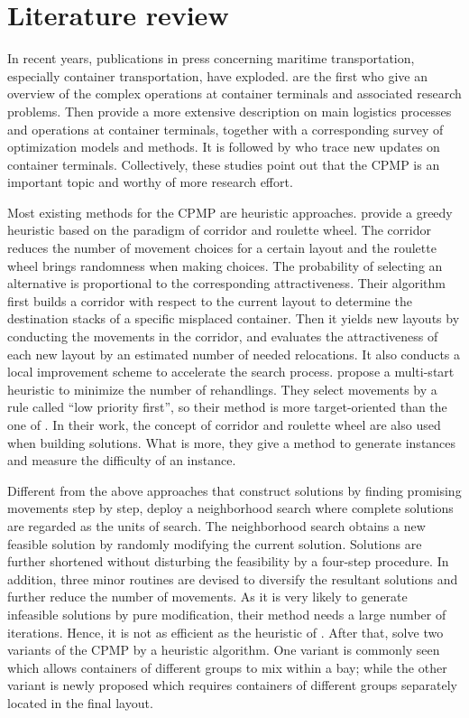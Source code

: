 \documentclass[review,3p,times,authoryear,12pt]{elsarticle}
\begin{document}
\section{Literature review}
\label{sec:litreview}

In recent years, publications in press concerning maritime transportation, especially container transportation, have exploded. \cite{Vis2003} are the first who give an overview of the complex operations at container terminals and associated research problems.
Then \cite{Steenken2004} provide a more extensive description on main logistics processes and operations at container terminals, together with a corresponding survey of optimization models and methods. It is followed by \cite{Stahlbock2008} who trace new updates on container terminals.
Collectively, these studies point out that the CPMP is an important topic and worthy of more research effort.

Most existing methods for the CPMP are heuristic approaches. \cite{Caserta2009} provide a greedy heuristic based on the paradigm of corridor and roulette wheel. The corridor reduces the number of movement choices for a certain layout and the roulette wheel brings randomness when making choices. The probability of selecting an alternative is proportional to the corresponding attractiveness.
Their algorithm first builds a corridor with respect to the current layout to determine the destination stacks of a specific misplaced container. Then it yields new layouts by conducting the movements in the corridor, and evaluates the attractiveness of each new layout by an estimated number of needed relocations. It also conducts a local improvement scheme to accelerate the search process.
\cite{Exposito2012} propose a multi-start heuristic to minimize the number of rehandlings. They select movements by a rule called ``low priority first'', so their method is more target-oriented than the one of \cite{Caserta2009}. In their work, the concept of corridor and roulette wheel are also used when building solutions. What is more, they give a method to generate instances and measure the difficulty of an instance.

Different from the above approaches that construct solutions by finding promising movements step by step, \cite{Lee2009} deploy a neighborhood search where complete solutions are regarded as the units of search. The neighborhood search obtains a new feasible solution by randomly modifying the current solution.
Solutions are further shortened without disturbing the feasibility by a four-step procedure. In addition, three minor routines are devised to diversify the resultant solutions and further reduce the number of movements. As it is very likely to generate infeasible solutions by pure modification, their method needs a large number of iterations. Hence, it is not as efficient as the heuristic of \cite{Exposito2012}.
After that, \cite{Huang2012heu} solve two variants of the CPMP by a heuristic algorithm. One variant is commonly seen which allows containers of different groups to mix within a bay; while the other variant is newly proposed which requires containers of different groups separately located in the final layout.
\end{document}
